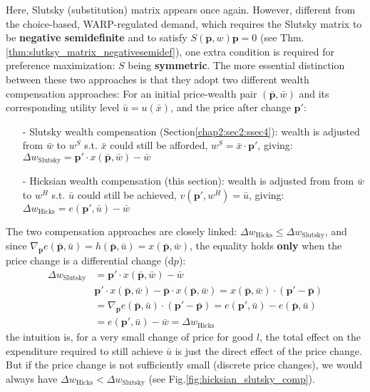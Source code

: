 Here, Slutsky (substitution) matrix appears once again. However, different from the choice-based, WARP-regulated demand, which requires the Slutsky matrix to be \textbf{negative semidefinite} and to satisfy $S(\mathbf{p},w)\mathbf{p}=0$ (see Thm.\ref{thm:slutksy_matrix_negativesemidef}), one extra condition is required for preference maximization: $S$ being \textbf{symmetric}.
The more essential distinction between these two approaches is that they adopt two different wealth compensation approaches: For an initial price-wealth pair $(\bar{\mathbf{p}},\bar{w})$ and its corresponding utility level $\bar{u}=u(\bar{x})$, and the price after change $\mathbf{p}'$:
\begin{enumerate}
    \item[-] Slutsky wealth compensation (Section\ref{chap2:sec2:ssec4}): wealth is adjusted from $\bar{w}$ to $w^S$ s.t. $\bar{x}$ could still be afforded, $w^S=\bar{x}\cdot \mathbf{p}'$, giving: $\Delta w_{\text{Slutsky}}=\mathbf{p}'\cdot x(\bar{\mathbf{p}},\bar{w})-\bar{w}$
    \item[-] Hicksian wealth compensation (this section): wealth is adjusted from from $\bar{w}$ to $w^H$ s.t. $\bar{u}$ could still be achieved, $v(\mathbf{p}',w^H)=\bar{u}$, giving: $\Delta w_{\text{Hicks}}=e(\mathbf{p}',\bar{u})-\bar{w}$
\end{enumerate}
The two compensation approaches are closely linked: $\Delta w_{\text{Hicks}}\leq \Delta w_{\text{Slutsky}}$, and since $\nabla_{\mathbf{p}}e(\bar{\mathbf{p}},\bar{u}) = h(\bar{\mathbf{p}},\bar{u})=x(\bar{\mathbf{p}},\bar{w})$, the equality holds \textbf{only} when the price change is a differential change ($\mathrm{d}p$):
\begin{align*}
    \Delta w_{\text{Slutsky}} &= \mathbf{p}'\cdot x(\bar{\mathbf{p}},\bar{w})-\bar{w} \\
    & \mathbf{p}'\cdot x(\bar{\mathbf{p}},\bar{w})-\bar{\mathbf{p}}\cdot x(\bar{\mathbf{p}},\bar{w})= x(\bar{\mathbf{p}},\bar{w})\cdot(\mathbf{p}'-\bar{\mathbf{p}}) \\
    & = \nabla_{\mathbf{p}}e(\bar{\mathbf{p}},\bar{u})\cdot(\mathbf{p}'-\bar{\mathbf{p}}) = e(\mathbf{p}',\bar{u})-e(\bar{\mathbf{p}},\bar{u})\\
    & = e(\mathbf{p}',\bar{u})-\bar{w} = \Delta w_{\text{Hicks}}
\end{align*}
the intuition is, for a very small change of price for good $l$, the total effect on the expenditure required to still achieve $\bar{u}$ is just the direct effect of the price change. But if the price change is not sufficiently small (discrete price changes), we would always have $\Delta w_{\text{Hicks}}< \Delta w_{\text{Slutsky}}$ (see Fig.\ref{fig:hicksian_slutsky_comp}).

